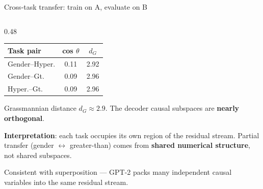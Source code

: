 \documentclass[aspectratio=169,11pt]{beamer}
\begin{document}
\begin{frame}{Cross-task transfer: train on A, evaluate on B}
\begin{columns}[T]
\begin{column}{0.48\textwidth}
\vspace{0.2em}
{\scriptsize\centering
\setlength{\tabcolsep}{3pt}
\renewcommand{\arraystretch}{1.05}
\begin{tabular}{@{}l|cc@{}}
\toprule
\textbf{Task pair} & \textbf{cos $\theta$} & \textbf{$d_G$} \\
\midrule
Gender--Hyper.  & 0.11 & 2.92 \\
Gender--Gt.     & 0.09 & 2.96 \\
Hyper.--Gt.     & 0.09 & 2.96 \\
\bottomrule
\end{tabular}
}

\vspace{0.3em}
{\scriptsize Grassmannian distance $d_G \approx 2.9$. The decoder causal subspaces are \textbf{nearly orthogonal}.}

\vspace{0.3em}
{\scriptsize \textbf{Interpretation}: each task occupies its own region of the residual stream. Partial transfer (gender $\leftrightarrow$ greater-than) comes from \textbf{shared numerical structure}, not shared subspaces.}

\vspace{0.3em}
{\scriptsize Consistent with superposition --- GPT-2 packs many independent causal variables into the same residual stream.}
\end{column}
\end{columns}
\end{frame}
\end{document}
